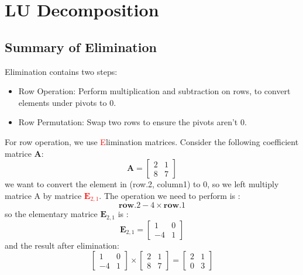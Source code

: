 \section{LU Decomposition}
    \subsection{Summary of Elimination}
        Elimination contains two steps:
            \begin{itemize}
                \item Row Operation: Perform multiplication and subtraction on rows, to convert elements under pivots to 0.
                \item Row Permutation: Swap two rows to ensure the pivots aren't 0. 
            \end{itemize}
        
        For row operation, we use \textcolor{red}{E}limination matrices. Consider the following coefficient matrice \textbf{A}:
            \begin{equation}
                \mathbf{A} = 
                \begin{bmatrix}
                    \boxed{2} & 1\\
                    8 & \boxed{7}
                \end{bmatrix}
            \end{equation}
        we want to convert the element in (row.2, column1) to 0, so we left multiply matrice A by matrice \textcolor{red}{$\mathbf{E}_{2,1}$}.
        The operation we need to perform is :
            \begin{equation}
                \mathbf{row.2} - 4 \times \mathbf{row.1}
            \end{equation}
        so the elementary matrice $ \textbf{E}_{2,1} $ is :
            \begin{equation}
                \mathbf{E}_{2,1} = 
                \begin{bmatrix}
                    1 & 0 \\
                    \boxed{-4} & 1
                \end{bmatrix}
            \end{equation}
        and the result after elimination:
            \begin{equation}
                \begin{bmatrix}
                    1 & 0 \\
                    \boxed{-4} & 1
                \end{bmatrix}
                \times
                \begin{bmatrix}
                    \boxed{2} & 1\\
                    8 & \boxed{7}
                \end{bmatrix}
                = 
                \begin{bmatrix}
                    \boxed{2} & 1\\
                    0 & \boxed{3}
                \end{bmatrix}
            \end{equation}

